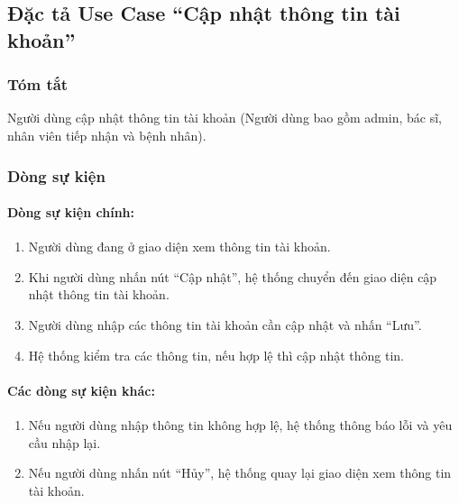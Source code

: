 \subsection{Đặc tả Use Case ``Cập nhật thông tin tài khoản''}

\subsubsection{Tóm tắt}
Người dùng cập nhật thông tin tài khoản (Người dùng bao gồm admin, bác sĩ, nhân viên tiếp nhận và bệnh nhân).

\subsubsection{Dòng sự kiện}
\paragraph{\textbf{Dòng sự kiện chính:}}
\begin{enumerate}
    \item Người dùng đang ở giao diện xem thông tin tài khoản.
    \item Khi người dùng nhấn nút ``Cập nhật'', hệ thống chuyển đến giao diện cập nhật thông tin tài khoản.
    \item Người dùng nhập các thông tin tài khoản cần cập nhật và nhấn ``Lưu''.
    \item Hệ thống kiểm tra các thông tin, nếu hợp lệ thì cập nhật thông tin.
\end{enumerate}

\paragraph{\textbf{Các dòng sự kiện khác:}}
\begin{enumerate}
    \item Nếu người dùng nhập thông tin không hợp lệ, hệ thống thông báo lỗi và yêu cầu nhập lại.
    \item Nếu người dùng nhấn nút ``Hủy'', hệ thống quay lại giao diện xem thông tin tài khoản.
\end{enumerate}

